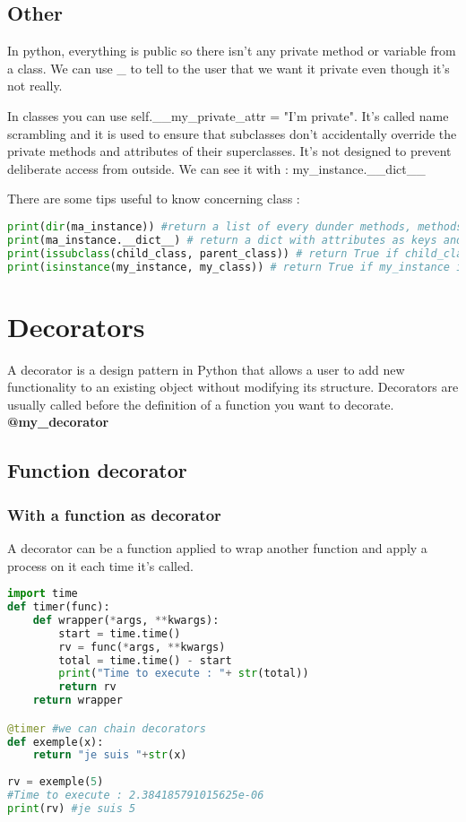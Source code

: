 \documentclass[a4paper, 12pt, titlepage]{scrartcl} %
\begin{document}
\subsection{Other}
In python, everything is public so there isn't any private method or variable from a class. We can use \_ to tell to the user that we want it private even though it's not really.

\vspace{5mm}

In classes you can use self.\_\_my\_private\_attr = "I'm private".
It's called name scrambling and it is used to ensure that subclasses don't accidentally override the private methods and attributes of their superclasses. It's not designed to prevent deliberate access from outside. We can see it with : my\_instance.\_\_dict\_\_

\vspace{5mm}

There are some tips useful to know concerning class :
\begin{lstlisting}[language=Python]
print(dir(ma_instance)) #return a list of every dunder methods, methods and attributes from the class.
print(ma_instance.__dict__) # return a dict with attributes as keys and their value. associated.
print(issubclass(child_class, parent_class)) # return True if child_class is the child of parent_class.
print(isinstance(my_instance, my_class)) # return True if my_instance is an instance from my_class.
\end{lstlisting} \vspace{5mm}

\newpage
\section{Decorators}
A decorator is a design pattern in Python that allows a user to add new functionality to an existing object without modifying its structure. Decorators are usually called before the definition of a function you want to decorate. \textbf{@my\_decorator}

\subsection{Function decorator}

\subsubsection{With a function as decorator}
A decorator can be a function applied to wrap another function and apply a process on it each time it's called.
\begin{lstlisting}[language=Python]
import time
def timer(func):
	def wrapper(*args, **kwargs):
		start = time.time()
		rv = func(*args, **kwargs)
		total = time.time() - start
		print("Time to execute : "+ str(total))
		return rv
	return wrapper

@timer #we can chain decorators
def exemple(x):
	return "je suis "+str(x)
	
rv = exemple(5)
#Time to execute : 2.384185791015625e-06
print(rv) #je suis 5
\end{lstlisting} \vspace{5mm}
\end{document}
